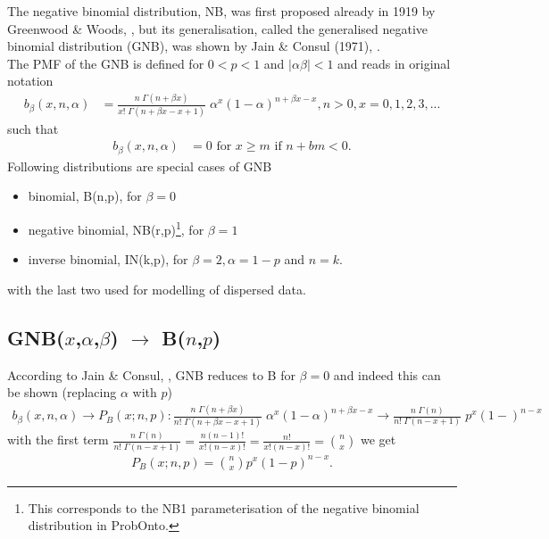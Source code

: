 The negative binomial distribution, NB, was first proposed already in 1919 by
Greenwood \& Woods, \cite{greenwood1920inquiry}, but its generalisation, 
called the generalised negative binomial distribution (GNB), was shown by Jain \& Consul (1971), 
\cite{jain1971generalized}. \\
The PMF of the GNB is defined for $0<p<1$ and $|\alpha \beta| < 1$ and reads in original notation
\begin{align*}
b_{\beta}(x,n,\alpha) &= 
\frac{n \; \Gamma(n+\beta x)}{x! \;\Gamma(n + \beta x - x +1)}  \; \alpha^x (1-\alpha)^{n+\beta x-x}, n>0, x=0,1,2,3,...
\end{align*}
such that
\begin{align*}
b_{\beta}(x,n,\alpha) &= 0 \text{ for } x \geq m \text{ if } n+bm < 0.
\end{align*}
Following distributions
are special cases of GNB
\begin{itemize}
\item 
binomial, B(n,p), for $\beta = 0$
\item 
negative binomial, NB(r,p)\footnote{This corresponds to the NB1 parameterisation 
of the negative binomial distribution in ProbOnto.}, for $\beta=1$
\item 
inverse binomial, IN(k,p), for $\beta = 2, \alpha=1-p$ and $n=k$.
\end{itemize}
with the last two used for modelling of dispersed data.


\subsection{GNB($x$,$\alpha$,$\beta$) $\rightarrow$ B($n$,$p$)}
According to Jain \& Consul, \cite{jain1971generalized}, GNB reduces to B for $\beta = 0$ and 
indeed this can be shown (replacing $\alpha$ with $p$)
\begin{align*}
 b_{\beta}(x,n,\alpha) \rightarrow P_{B}(x;n,p): %
 \frac{n \; \Gamma(n+\beta x)}{n! \;\Gamma(n + \beta x - x +1)}  \; \alpha^x (1-\alpha)^{n+\beta x-x} \rightarrow 
\frac{n \; \Gamma(n)}{n! \;\Gamma(n - x +1)}  \; p^x (1-)^{n-x} 
\end{align*}
with the first term $\frac{n \; \Gamma(n)}{n! \;\Gamma(n - x +1)} = \frac{n (n-1)!}{x! (n-x)!} 
= \frac{n!}{x!(n-x)!} = {n \choose x}$ we get 
\begin{align*}
P_{B}(x;n,p) = {n \choose x} p^x (1-p)^{n-x}.
\end{align*}



